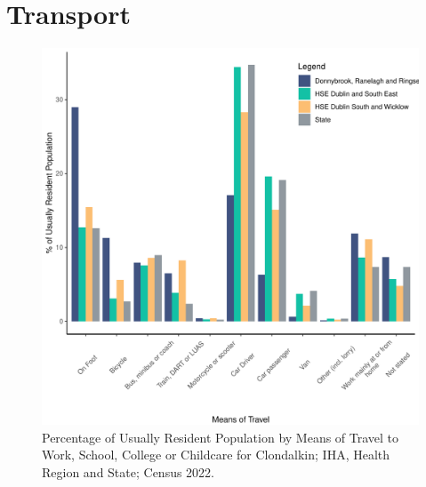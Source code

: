 \documentclass{article}
\begin{document}
\section{Transport}\label{sect:Trans}
\begin{figure}[H]
	\centering
	\includegraphics[width = 120mm]{../figures/TravelED.pdf}
	\caption{Percentage of Usually Resident Population by Means of Travel to Work, School, College or Childcare for Clondalkin; IHA, Health Region and State; Census 2022.}
	\label{fig:vbnv}
	\end{figure}
\end{document}
